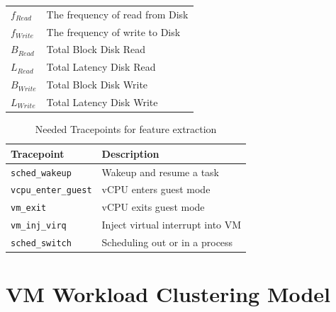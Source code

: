 \documentclass[10pt, conference, compsocconf]{IEEEtran}
\begin{document}
\begin{table}
\begin{tabular}{ll}
  \footnotesize \textit{$f_{Read}$} & \footnotesize The frequency of read from Disk\\
  \footnotesize \textit{$f_{Write}$} & \footnotesize The frequency of write to Disk\\
  \footnotesize \textit{$B_{Read}$} & \footnotesize Total Block Disk Read\\
  \footnotesize \textit{$L_{Read}$} & \footnotesize Total Latency Disk Read\\
  \footnotesize \textit{$B_{Write}$} & \footnotesize Total Block Disk Write\\
  \footnotesize \textit{$L_{Write}$} & \footnotesize Total Latency Disk Write\\
  \hline
\end{tabular}
\label{tab:notation}
\end{table}



\begin{table}
\caption{Needed Tracepoints for feature extraction}
\centering
\begin{tabular}{p{2.5cm}p{5.8cm}}
  \hline
  \rowcolor{Gray}
  \footnotesize \textbf{Tracepoint} & \footnotesize \textbf{Description} \\
  \hline
  \hline
  
  \footnotesize \texttt{sched\_wakeup}  & \footnotesize Wakeup and resume a task \\
  \footnotesize \texttt{vcpu\_enter\_guest}  & \footnotesize vCPU enters guest mode \\
  \footnotesize \texttt{vm\_exit}  & \footnotesize vCPU exits guest mode \\
  \footnotesize \texttt{vm\_inj\_virq}  & \footnotesize Inject virtual interrupt into VM \\
  \footnotesize \texttt{sched\_switch}  & \footnotesize  Scheduling out or in a process\\
    \hline
\end{tabular}
\label{tab:agent-base-tracepoints}
\end{table}

\section{VM Workload Clustering Model}
\end{document}
